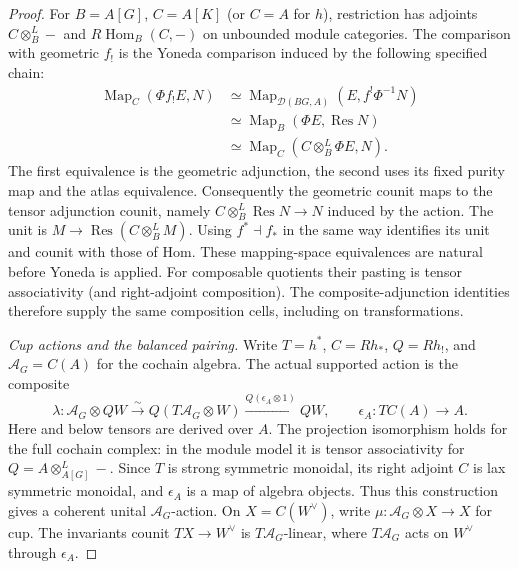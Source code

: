 \documentclass[11pt]{article}
\theoremstyle{definition}
\theoremstyle{remark}
\begin{document}
\begin{proof}
For $B=A[G]$, $C=A[K]$ (or $C=A$ for $h$), restriction has adjoints
$C\otimes_B^L-$ and $R\operatorname{Hom}_B(C,-)$ on unbounded
module categories.  The comparison with geometric $f_!$ is the
Yoneda comparison induced by the following specified chain:
\[
\begin{aligned}
 \operatorname{Map}_C(\Phi f_!E,N)
 &\simeq\operatorname{Map}_{\mathcal D(BG,A)}(E,f^!\Phi^{-1}N)\\
 &\simeq\operatorname{Map}_B(\Phi E,\operatorname{Res}N)\\
 &\simeq\operatorname{Map}_C(C\otimes_B^L\Phi E,N).
\end{aligned}
\]
The first equivalence is the geometric adjunction, the second uses
its fixed purity map and the atlas equivalence.  Consequently the
geometric counit maps to the tensor adjunction counit, namely
$C\otimes_B^L\operatorname{Res}N\to N$ induced by the action.
The unit is $M\to\operatorname{Res}(C\otimes_B^LM)$.
Using $f^*\dashv f_*$ in the same way identifies its unit and
counit with those of Hom.  These mapping-space equivalences are
natural before Yoneda is applied.  For composable quotients their
pasting is tensor associativity (and right-adjoint composition).
The composite-adjunction identities therefore supply the same
composition cells, including on transformations.

\emph{Cup actions and the balanced pairing.}
Write $T=h^*$, $C=Rh_*$, $Q=Rh_!$, and
$\mathcal A_G=C(A)$ for the cochain algebra.  The actual supported
action is the composite
\begin{equation}
 \lambda:\mathcal A_G\otimes QW
 \xrightarrow{\sim}Q(T\mathcal A_G\otimes W)
 \xrightarrow{Q(\epsilon_A\otimes1)}QW,
 \qquad \epsilon_A:TC(A)\longrightarrow A.
 \label{eq:frag-finite-supported-cup-action}
\end{equation}
Here and below tensors are derived over $A$.  The projection
isomorphism holds for the full cochain complex: in the module model
it is tensor associativity for $Q=A\otimes^L_{A[G]}-$.
Since $T$ is strong symmetric monoidal, its right adjoint $C$ is lax
symmetric monoidal, and $\epsilon_A$ is a map of algebra objects.
Thus this construction gives a coherent unital $\mathcal A_G$-action.
On $X=C(W^\vee)$, write $\mu:\mathcal A_G\otimes X\to X$ for cup.
The invariants counit $TX\to W^\vee$ is $T\mathcal A_G$-linear,
where $T\mathcal A_G$ acts on $W^\vee$ through $\epsilon_A$.


\end{proof}
\end{document}
